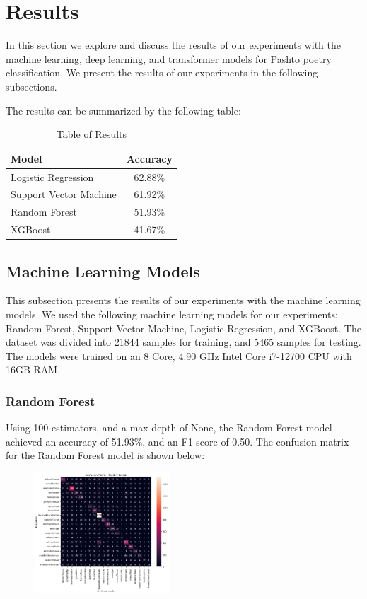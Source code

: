 \section{Results}

In this section we explore and discuss the results of our experiments with the machine learning, deep learning, and transformer models for Pashto poetry classification. We present the results of our experiments in the following subsections. 

The results can be summarized by the following table:

\begin{table}[ht]
    \centering
    \begin{tabular}{|l|c|}
        \hline
        \textbf{Model} & \textbf{Accuracy} \\
        \hline
        Logistic Regression & 62.88\% \\
        Support Vector Machine & 61.92\% \\
        Random Forest & 51.93\% \\
        XGBoost & 41.67\% \\
        \hline
    \end{tabular}
    \caption{Table of Results}
    \label{tab:results}
\end{table}

\subsection{Machine Learning Models}

This subsection presents the results of our experiments with the machine learning models. We used the following machine learning models for our experiments: Random Forest, Support Vector Machine, Logistic Regression, and XGBoost. The dataset was divided into 21844 samples for training, and 5465 samples for testing. The models were trained on an 8 Core, 4.90 GHz Intel Core i7-12700 CPU with 16GB RAM. 

\subsubsection{Random Forest}
Using 100 estimators, and a max depth of None, the Random Forest model achieved an accuracy of 51.93\%, and an F1 score of 0.50. The confusion matrix for the Random Forest model is shown below:
\begin{figure}[H]
    \centering
    \includegraphics[width=0.45\textwidth]{rf_confmat.png}
\end{figure}

